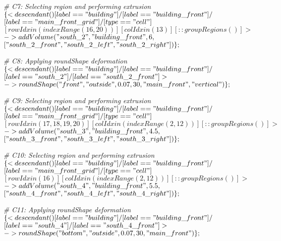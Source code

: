\noindent \textit{\# C7: Selecting region and performing extrusion}\\
$\{< descendant() [label=="building"] / [label=="building\_front"] / $\\
$[label=="main\_front\_grid"] / [type=="cell"] $\\
$[rowIdx in (indexRange(16, 20))] [colIdx in (13)] [::groupRegions()] > $\\
$-> addVolume("south\_2", "building\_front", 6, $\\
$["south\_2\_front", "south\_2\_left", "south\_2\_right"])\};$

\noindent \textit{\# C8: Applying roundShape deformation} \\
$\{< descendant() [label=="building"] / [label=="building\_front"] / $\\
$[label=="south\_2"] / [label=="south\_2\_front"] > $\\
$-> roundShape("front", "outside", 0.07, 30, "main\_front", "vertical")\};$

\noindent \textit{\# C9: Selecting region and performing extrusion}\\
$\{< descendant() [label=="building"] / [label=="building\_front"] / $\\
$[label=="main\_front\_grid"] / [type=="cell"] $\\
$[rowIdx in (17, 18, 19, 20)] [colIdx in (indexRange(2, 12))] [::groupRegions()] > $\\
$-> addVolume("south\_3", "building\_front", 4.5, $\\
$["south\_3\_front", "south\_3\_left", "south\_3\_right"])\};$

\noindent \textit{\# C10: Selecting region and performing extrusion}\\
$\{< descendant() [label=="building"] / [label=="building\_front"] / $\\
$[label=="main\_front\_grid"] / [type=="cell"] $\\
$[rowIdx in (16)] [colIdx in (indexRange(2, 12))] [::groupRegions()] > $\\
$-> addVolume("south\_4", "building\_front", 5.5, $\\
$["south\_4\_front", "south\_4\_left", "south\_4\_right"])\};$

\noindent \textit{\# C11: Applying roundShape deformation}\\
$\{< descendant() [label=="building"] / [label=="building\_front"] / $\\
$[label=="south\_4"] / [label=="south\_4\_front"] > $\\
$-> roundShape("bottom", "outside", 0.07, 30, "main\_front")\};$

